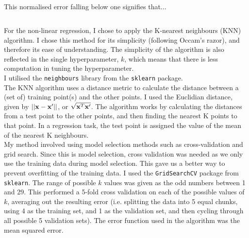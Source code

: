 \documentclass{scrartcl}
\begin{document}
This normalised error falling below one signifies that...

\subsection{}

For the non-linear regression, I chose to apply the K-nearest neighbours (KNN) algorithm. I chose this method for its simplicity (following Occam's razor), and therefore its ease of understanding. The simplicity of the algorithm is also reflected in the single hyperparameter, $k$, which means that there is less computation in tuning the hyperparameter. \\

I utilised the \texttt{neighbours} library from the \texttt{sklearn} package. \\

The KNN algorithm uses a distance metric to calculate the distance between a (set of) training point(s) and the other points. I used the Euclidian distance, given by $ || {\mathbf x} - {\mathbf x}' || $, or $ \sqrt {{\mathbf x}^T {\mathbf x}' } $. The algorithm works by calculating the distances from a test point to the other points, and then finding the nearest K points to that point. In a regression task, the test point is assigned the value of the mean of the nearest K neighbours. \\

My method involved using model selection methods such as cross-validation and grid search. Since this is model selection, cross validation was needed as we only use the training data during model selection. This gave us a better way to prevent overfitting of the training data. I used the \texttt{GridSearchCV} package from \texttt{sklearn}. The range of possible $k$ values was given as the odd numbers between 1 and 29. This performed a 5-fold cross validation on each of the possible values of $k$, averaging out the resulting error (i.e. splitting the data into 5 equal chunks, using 4 as the training set, and 1 as the validation set, and then cycling through all possible 5 validation sets). The error function used in the algorithm was the mean squared error.\\
\end{document}
